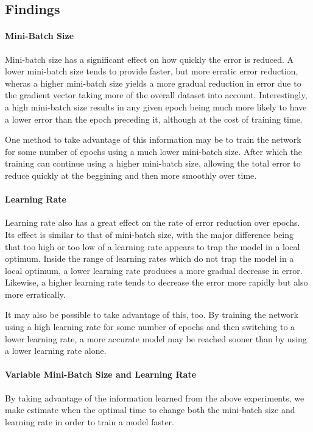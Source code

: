 \newpage

\subsection{Findings}
\paragraph{Mini-Batch Size}
Mini-batch size has a significant effect on how quickly the error is
reduced. A lower mini-batch size tends to provide faster, but more
erratic error reduction, wheras a higher mini-batch size yields a more
gradual reduction in error due to the gradient vector taking more of the
overall dataset into account. Interestingly, a high mini-batch size
results in any given epoch being much more likely to have a lower error
than the epoch preceding it, although at the cost of training time.

One method to take advantage of this information may be to train the
network for some number of epochs using a much lower mini-batch size.
After which the training can continue using a higher mini-batch size,
allowing the total error to reduce quickly at the beggining and then
more smoothly over time.


\paragraph{Learning Rate}
Learning rate also has a great effect on the rate of error reduction
over epochs. Its effect is similar to that of mini-batch size, with the
major difference being that too high or too low of a learning rate
appears to trap the model in a local optimum. Inside the range of
learning rates which do not trap the model in a local optimum, a lower
learning rate produces a more gradual decrease in error. Likewise, a
higher learning rate tends to decrease the error more rapidly but also
more erratically.

It may also be possible to take advantage of this, too. By training the
network using a high learning rate for some number of epochs and then
switching to a lower learning rate, a more accurate model may be reached
sooner than by using a lower learning rate alone.


\paragraph{Variable Mini-Batch Size and Learning Rate}
By taking advantage of the information learned from the above
experiments, we make estimate when the optimal time to change both
the mini-batch size and learning rate in order to train a model faster.

